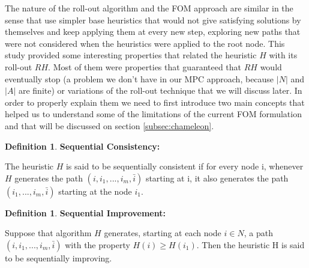 \documentclass[12,twoside]{TFG-GM}
\theoremstyle{definition}
\newtheorem{definition}[theorem]{Definition}
\theoremstyle{remark}
\newcommand*\diff[1]{\bar{#1}}
\begin{document}
The nature of the roll-out algorithm and the FOM approach are similar in the sense that use simpler base heuristics that would not give satisfying solutions by themselves and keep applying them at every new step, exploring new paths that were not considered when the heuristics were applied to the root node. This study provided some interesting properties that related the heuristic $H$ with its roll-out $RH$. Most of them were properties that guaranteed that $RH$ would eventually stop (a problem we don't have in our MPC approach, because $|N|$ and $|A|$ are finite) or variations of the roll-out technique that we will discuss later. In order to properly explain them we need to first introduce two main concepts that helped us to understand some of the limitations of the current FOM formulation and that will be discussed on section \ref{subsec:chameleon}. 

\begin{definition} \label{seq_cons} \textbf{Sequential Consistency:}

The heuristic $H$ is said to be sequentially consistent if for every node i, whenever $H$ generates the path $(i, i_1,..., i_m, \diff{i})$ starting at i, it also generates the path $(i_1,..., i_m, \diff{i})$ starting at the node $i_1$.
\end{definition}

\begin{definition} \label{seq_impr} \textbf{Sequential Improvement:}

Suppose that algorithm $H$ generates, starting at each node $i \in N$, a path
$(i, i_1,..., i_m, \diff{i})$ with the property $H(i) \geq H(i_1)$. Then the heuristic H is said to be sequentially improving.

\end{definition}
\end{document}
